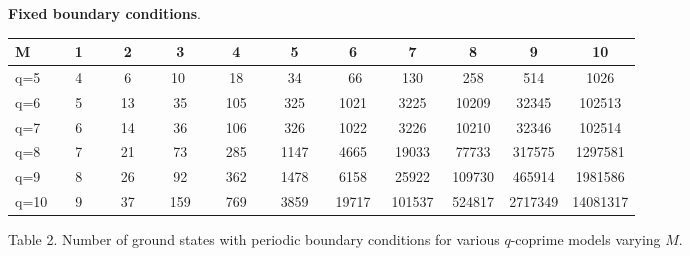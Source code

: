 \documentclass[aps,pra,superscriptaddress]{revtex4}
\renewcommand{\(}{\left(}
\renewcommand{\)}{\right)}
\renewcommand{\[}{\left[}
\renewcommand{\]}{\right]}
\begin{document}
\vspace{3mm}
\noindent
{\bf Fixed boundary conditions}. 



\begin{table}[t]\label{groundstatenumbers}
\begin{center}
\begin{tabular}{||l|c|c|c|c|c|c|c|c|c|c||} \hline 
M & 1 & 2 & 3 & 4 & 5 & 6 & 7 & 8 & 9 & 10\\
 \hline \hline 
 q=5 & \,\,\,\,\,\,4\,\,\,\,\,\, & \,\,\,\,\,\,6\,\,\,\,\,\, & \,\,\,\,\,10 \,\,\,\,\, & \,\,\,\,\,\,18\,\,\,\,\,\, & \,\,\,\,\, 34 \,\,\,\,\, & \,\,\,\,\, 66\,\,\,\,\,  &  \,\,\,\, 130 \,\,\,\, & 
 \,\,\, 258 \,\,\, & 514 &1026\\
 \hline
 q=6 & \,\,\,5\,\,\, & 13 & 35 & 105 & 325 & 1021 & 3225 & 10209 & 32345 & 102513 \\
 \hline 
 q=7 & 6 & 14 & 36 & 106 & 326 & 1022 & 3226 & 10210 & 32346 & 102514 \\
 \hline
 q=8 & 7 & 21 & 73 & 285 & 1147 & 4665 & 19033 & 77733 & 317575 & 1297581 \\
 \hline
 q=9 & 8 & 26 & 92 & 362 & 1478 & 6158 & 25922 & 109730 & 465914 & 1981586 \\
\hline
q=10 & 9 & 37 & 159 & 769 & 3859 & 19717 & 101537 & 524817 & 2717349 & 14081317\\
\hline
\end{tabular}
\end{center}
Table 2. Number of ground states with periodic boundary conditions for various $q$-coprime models varying $M$.
\end{table} 
\end{document}
